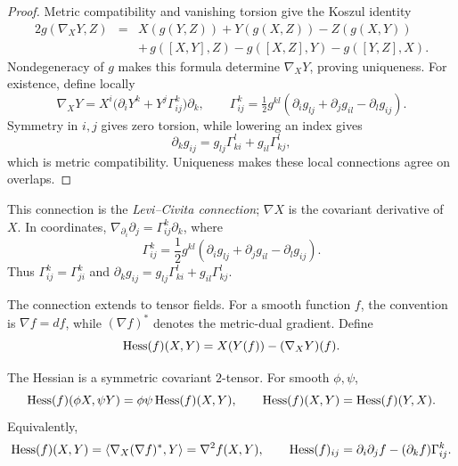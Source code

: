\begin{proof}
\sketch
{}

Metric compatibility and vanishing torsion give the Koszul identity
\begin{eqnarray}\label{Koszul}
2g(\nabla_XY,Z) & = & X(g(Y,Z))+Y(g(X,Z))-Z(g(X,Y)) \\
& & +\, g([X,Y],Z)-g([X,Z],Y)-g([Y,Z],X). \nonumber
\end{eqnarray}
Nondegeneracy of $g$ makes this formula determine $\nabla_XY$, proving
uniqueness. For existence, define locally
\[
  \nabla_XY=X^i\bigl(\partial_iY^k+Y^j\Gamma^k_{ij}\bigr)\partial_k,
  \qquad
  \Gamma^k_{ij}=\tfrac12g^{kl}
  (\partial_i g_{lj}+\partial_j g_{il}-\partial_l g_{ij}).
\]
Symmetry in $i,j$ gives zero torsion, while lowering an index gives
\[
  \partial_k g_{ij}=g_{lj}\Gamma^l_{ki}+g_{il}\Gamma^l_{kj},
\]
which is metric compatibility. Uniqueness makes these local connections
agree on overlaps.
\end{proof}

This connection is the \emph{Levi--Civita connection}; $\nabla X$ is
the covariant derivative of $X$. In coordinates,
$\nabla_{\partial_i}\partial_j=\Gamma^k_{ij}\partial_k$, where
\begin{equation}\label{Gamma}
  \Gamma^{k}_{ij}=\frac12g^{kl}
  (\partial_i g_{lj}+\partial_j g_{il}-\partial_l g_{ij}).
\end{equation}
Thus $\Gamma^k_{ij}=\Gamma^k_{ji}$ and
$\partial_k g_{ij}=g_{lj}\Gamma^l_{ki}+g_{il}\Gamma^l_{kj}$.

The connection extends to tensor fields. For a smooth function $f$,
the convention is $\nabla f=df$, while $(\nabla f)^*$ denotes the
metric-dual gradient. Define
\begin{equation}\label{Hessian}
  \operatorname{Hess}(f)(X,Y)=X(Y(f))-(\nabla_XY)(f).
\end{equation}
\begin{lemma}
\label{lem:hessian-symmetric}


\label{Hessformula}



The Hessian is a symmetric covariant $2$-tensor. For smooth
$\phi,\psi$,
\[
  \operatorname{Hess}(f)(\phi X,\psi Y)=\phi\psi\operatorname{Hess}(f)(X,Y),
  \qquad \operatorname{Hess}(f)(X,Y)=\operatorname{Hess}(f)(Y,X).
\]
Equivalently,
\[
  \operatorname{Hess}(f)(X,Y)=\langle\nabla_X(\nabla f)^*,Y\rangle
  =\nabla^2f(X,Y),
  \qquad
  \operatorname{Hess}(f)_{ij}=\partial_i\partial_jf-(\partial_kf)\Gamma^k_{ij}.
\]
\end{lemma}

